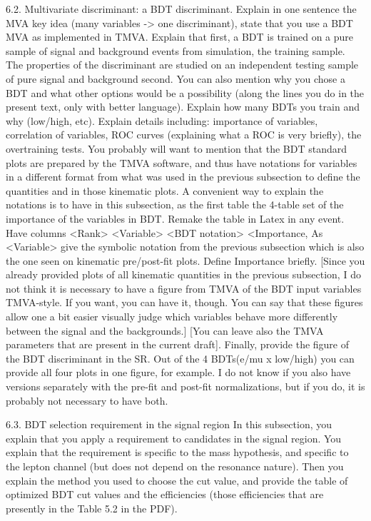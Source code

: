            6.2. Multivariate discriminant: a BDT discriminant.
           Explain in one sentence the MVA  key  idea (many variables -> one discriminant), state
           that you use a BDT MVA as implemented in TMVA. Explain that first, a BDT is trained
           on a pure sample of signal and background events from simulation, the training sample. 
           The  properties of the discriminant are studied on an independent testing sample of pure signal 
           and background second. You can also mention  why you chose a BDT and what other options
           would be a possibility (along the lines you do in the present text, only with better language).
                Explain how many BDTs you train and why (low/high, etc). 
                Explain details including: importance of variables, correlation of variables, ROC curves
           (explaining what a ROC is very briefly), the overtraining tests. You probably will  want  to 
           mention that the BDT standard plots are prepared by the TMVA software, and thus have
           notations for variables in a different format from what was used in the previous subsection
           to define the quantities and in those kinematic plots. A convenient  way to explain the notations
           is to have in this subsection, as  the first table the 4-table set of the importance of the variables in BDT.
           Remake the table in Latex in any event. Have columns <Rank> <Variable> <BDT notation> <Importance, %
           As <Variable> give the symbolic notation from the previous subsection which is also the one seen
           on kinematic pre/post-fit plots. Define Importance briefly.
           [Since you already provided plots of all kinematic quantities in the previous subsection, I do not  think
           it is necessary to have a figure from TMVA  of  the BDT input variables TMVA-style. If you want,
           you can have it, though. You can say  that these figures allow one a bit easier visually judge
           which variables behave more differently between the  signal and the backgrounds.]
           [You can leave also the TMVA parameters that are present in the current draft].
                Finally, provide the figure of the BDT discriminant in the SR. Out of the 4 BDTs(e/mu x low/high)
           you can provide all four plots in one figure, for example. I do not know if you also have versions
           separately with the pre-fit and post-fit normalizations, but if you do, it is probably not necessary
           to have both.

           6.3. BDT selection requirement in the signal region
                 In this subsection, you explain that  you apply a requirement to candidates in the signal region.
           You explain that the requirement is specific to the mass hypothesis, and specific to the lepton channel
           (but does not depend on the resonance nature). Then you explain the  method you used to choose 
           the cut value, and provide the table of optimized BDT cut values and the efficiencies (those efficiencies
           that  are presently in the  Table 5.2 in the PDF).

